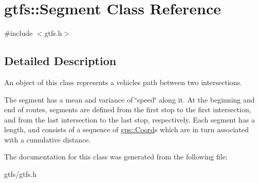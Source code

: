 \hypertarget{classgtfs_1_1Segment}{}\section{gtfs\+:\+:Segment Class Reference}
\label{classgtfs_1_1Segment}


{\ttfamily \#include $<$gtfs.\+h$>$}



\subsection{Detailed Description}
An object of this class represents a vehicles path between two intersections.

The segment has a mean and variance of \char`\"{}speed\char`\"{} along it. At the beginning and end of routes, segments are defined from the first stop to the first intersection, and from the last intersection to the last stop, respectively. Each segment has a length, and consists of a sequence of \hyperlink{classgps_1_1Coord}{gps\+::\+Coord}\textquotesingle{}s which are in turn associated with a cumulative distance. 

The documentation for this class was generated from the following file\+:\begin{DoxyCompactItemize}
\item 
gtfs/gtfs.\+h\end{DoxyCompactItemize}
